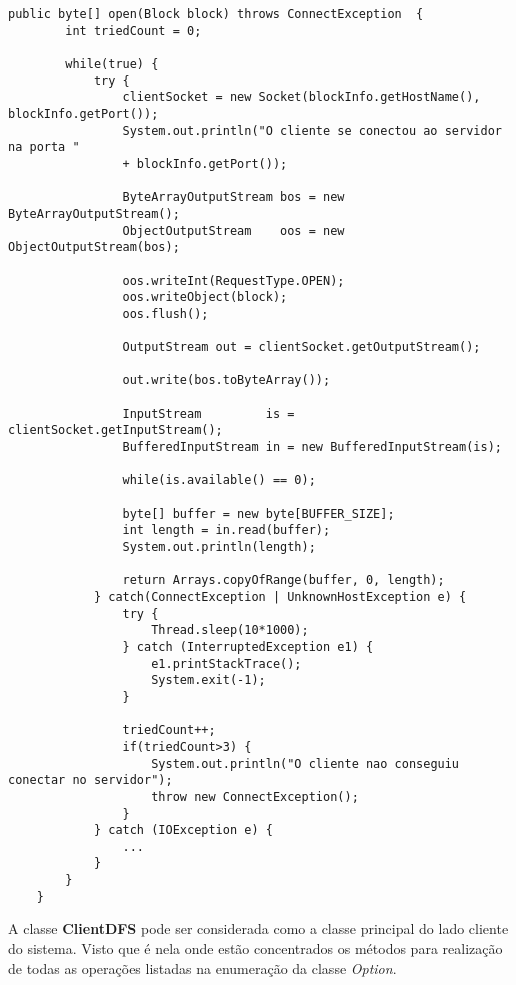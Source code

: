 \begin{lstlisting}[basicstyle=\ttfamily\footnotesize, frame=single, caption=Exemplo de método da classe ClientServerSocket, label=code:clent_socket1]	
	public byte[] open(Block block) throws ConnectException  {
		int triedCount = 0;
		
		while(true) {
			try {
				clientSocket = new Socket(blockInfo.getHostName(), blockInfo.getPort());
				System.out.println("O cliente se conectou ao servidor na porta " 
				+ blockInfo.getPort());
				
				ByteArrayOutputStream bos = new ByteArrayOutputStream();
				ObjectOutputStream    oos = new ObjectOutputStream(bos);
				
				oos.writeInt(RequestType.OPEN);
				oos.writeObject(block);
				oos.flush();
				
				OutputStream out = clientSocket.getOutputStream();
				
				out.write(bos.toByteArray());
			
				InputStream         is = clientSocket.getInputStream();
				BufferedInputStream in = new BufferedInputStream(is);
				
				while(is.available() == 0);
				
				byte[] buffer = new byte[BUFFER_SIZE];
				int length = in.read(buffer);
				System.out.println(length);
			
				return Arrays.copyOfRange(buffer, 0, length);
			} catch(ConnectException | UnknownHostException e) {
				try {
					Thread.sleep(10*1000);
				} catch (InterruptedException e1) {
					e1.printStackTrace();
					System.exit(-1);
				}
				
				triedCount++;
				if(triedCount>3) {
					System.out.println("O cliente nao conseguiu conectar no servidor");
					throw new ConnectException();
				}
			} catch (IOException e) {
				...
			}
		}
	}
\end{lstlisting}

A classe \textbf{ClientDFS} pode ser considerada como a classe principal do lado cliente do sistema. Visto que é nela onde estão concentrados os métodos para realização de todas as operações listadas na enumeração da classe \textit{Option}.
\\

